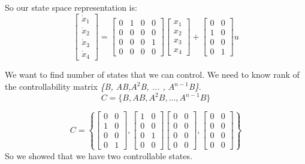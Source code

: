 So our state space representation is:
\begin{equation}
\begin{bmatrix}
\dot{x}_1\\ 
\dot{x}_2\\
\dot{x}_3\\
\dot{x}_4
\end{bmatrix} = \begin{bmatrix}
0 & 1 & 0 & 0 \\
0 & 0 & 0 & 0\\
0 & 0 & 0 & 1\\
0 & 0 & 0 & 0
\end{bmatrix}  \begin{bmatrix}
x_1\\
x_2\\
x_3\\
x_4
\end{bmatrix} + \begin{bmatrix}
0 & 0 \\
1 & 0 \\
0 & 0 \\
0 & 1
\end{bmatrix} u
\end{equation}

We want to find number of states that we can control. We need to know rank of the controllability matrix \emph{\{B, AB,$A^2$B, ... , $A^{n-1}$B\}}.
\begin{equation}
C = \{ B, AB, A^2B, ... , A^{n-1}B \}
\end{equation}

\begin{equation}
C=\left\{
\begin{bmatrix} 
0 & 0\\
1 & 0 \\
0 & 0 \\
0 & 1
\end{bmatrix}
,
\begin{bmatrix} 
1 & 0\\
0 & 0\\
0 & 1\\
0 & 0
\end{bmatrix}
\begin{bmatrix} 
0 & 0\\
0 & 0\\
0 & 0\\
0 & 0
\end{bmatrix}
,
\begin{bmatrix} 
0 & 0\\
0 & 0\\
0 & 0\\
0 & 0
\end{bmatrix}
 \right\}
\end{equation}
So we showed that we have two controllable states.

